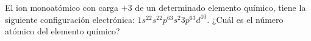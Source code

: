 El ion monoatómico con carga $ +3 $ de un determinado elemento químico, tiene la siguiente configuración electrónica: $ 1s^22s^22p^63s^2 3p^63d^{10} $. ¿Cuál es el número atómico del elemento químico?
